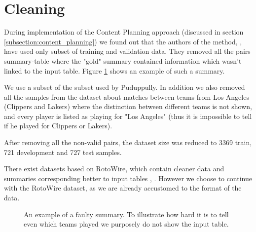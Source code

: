 \section{Cleaning} \label{section:cleaning}

During implementation of the Content Planning approach (discussed in section \ref{subsection:content_planning}) we found out that the authors of the method, \citep{puduppully2019datatotext}, have used only subset of training and validation data. They removed all the pairs summary-table where the "gold" summary contained information which wasn't linked to the input table. Figure \ref{figure:faulty_summary} shows an example of such a summary.

We use a subset of the subset used by Puduppully. In addition we also removed all the samples from the dataset about matches between teams from Los Angeles (Clippers and Lakers) where the distinction between different teams is not shown, and every player is listed as playing for "Los Angeles" (thus it is impossible to tell if he played for Clippers or Lakers).

After removing all the non-valid pairs, the dataset size was reduced to 3369 train, 721 development and 727 test samples.

There exist datasets based on RotoWire, which contain cleaner data and summaries corresponding better to input tables \citep{wang-2019-revisiting}, \citep{thomson-2020-sportsett}. However we choose to continue with the RotoWire dataset, as we are already accustomed to the format of the data.

\begin{figure}[h]
    \caption{\centering An example of a faulty summary. To illustrate how hard it is to tell even which teams played we purposely do not show the input table.} \label{figure:faulty_summary}
\end{figure}

